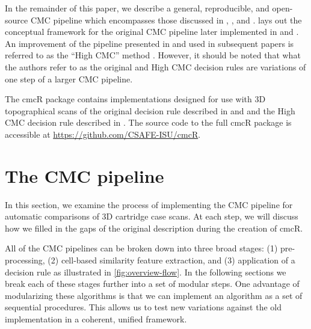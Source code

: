 \documentclass[11pt,]{isuthesis}
\begin{document}
In the remainder of this paper, we describe a general, reproducible, and open-source CMC pipeline which encompasses those discussed in \citet{song_proposed_2013}, \citet{song_3d_2014}, and \citet{tong_improved_2015}.
\citet{song_proposed_2013} lays out the conceptual framework for the original CMC pipeline later implemented in \citet{song_3d_2014} and \citet{tong_fired_2014}.
An improvement of the pipeline presented in \citet{tong_improved_2015} and used in subsequent papers is referred to as the ``High CMC'' method \citep{chen_convergence_2017}. However, it should be noted that what the authors refer to as the original and High CMC decision rules are variations of one step of a larger CMC pipeline.

The cmcR package contains implementations designed for use with 3D topographical scans of the original decision rule described in \citet{song_proposed_2013} and \citet{song_3d_2014} and the High CMC decision rule described in \citet{tong_improved_2015}.
The source code to the full cmcR package is accessible at \url{https://github.com/CSAFE-ISU/cmcR}.

\hypertarget{cmcMethod}{%
\section{The CMC pipeline}\label{cmcMethod}}

In this section, we examine the process of implementing the CMC pipeline for automatic comparisons of 3D cartridge case scans.
At each step, we will discuss how we filled in the gaps of the original description during the creation of cmcR.

All of the CMC pipelines can be broken down into three broad stages: (1) pre-processing, (2) cell-based similarity feature extraction, and (3) application of a decision rule as illustrated in \ref{fig:overview-flow}.
In the following sections we break each of these stages further into a set of modular steps.
One advantage of modularizing these algorithms is that we can implement an algorithm as a set of sequential procedures.
This allows us to test new variations against the old implementation in a coherent, unified framework.
\end{document}
